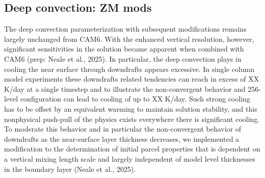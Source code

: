 \documentclass[draft]{agujournal2019}
\begin{document}
 \subsection{Deep convection: ZM mods}
 The deep convection parameterization \cite{ZM1995AO} with subsequent modifications\cite{NRJ2008JC} remains largely unchanged from CAM6. With the enhanced vertical resolution, however, significant sensitivities in the solution became apparent when combined with CAM6 (prep: Neale et al., 2025). In particular, the deep convection plays in cooling the near surface through downdrafts appears excessive. In single column model experiments these downdrafts related tendencies can reach in excess of XX K/day at a single timestep and to illustrate the non-convergent behavior and 256-level configuration can lead to cooling of up to XX K/day. Such strong cooling has to be offset by an equivalent warming to maintain solution stability, and this nonphysical push-pull of the physics exists everywhere there is significant cooling. To moderate this behavior and in particular the non-convergent behavior of downdrafts as the near-surface layer thickness decreases, we implemented a modification to the determination of initial parcel properties that is dependent on a vertical mixing length scale and largely independent of model level thicknesses in the boundary layer (Neale et al., 2025).
\end{document}
